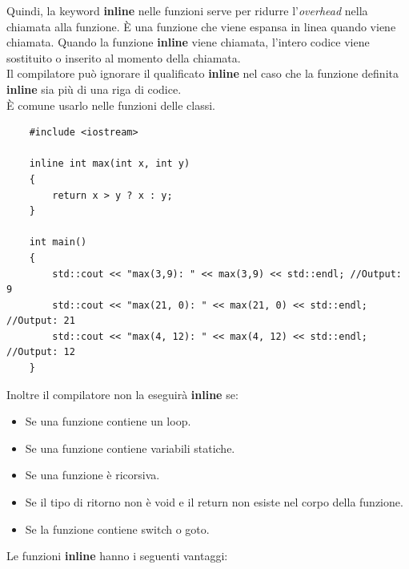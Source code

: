 \textsf{\small Quindi, la keyword \textbf{inline} nelle funzioni serve per ridurre l'\emph{overhead} nella chiamata alla funzione. È una funzione che viene espansa in linea quando viene chiamata. Quando la funzione \textbf{inline} viene chiamata, l'intero codice viene sostituito o inserito al momento della chiamata.} \\

\textsf{\small Il compilatore può ignorare il qualificato \textbf{inline} nel caso che la funzione definita \textbf{inline} sia più di una riga di codice.} \\

\textsf{\small È comune usarlo nelle funzioni delle classi. } \\

\begin{lstlisting}
	#include <iostream>
	
	inline int max(int x, int y)
	{
		return x > y ? x : y;
	}

	int main()
	{
		std::cout << "max(3,9): " << max(3,9) << std::endl; //Output: 9
		std::cout << "max(21, 0): " << max(21, 0) << std::endl; //Output: 21
		std::cout << "max(4, 12): " << max(4, 12) << std::endl; //Output: 12
	}
\end{lstlisting}

\textsf{\small Inoltre il compilatore non la eseguirà \textbf{inline} se: } \\

\begin{itemize}
	\item \textsf{\small Se una funzione contiene un loop.}
	\item \textsf{\small Se una funzione contiene variabili statiche.}
	\item \textsf{\small Se una funzione è ricorsiva.}
	\item \textsf{\small Se il tipo di ritorno non è void e il return non esiste nel corpo della funzione.}
	\item \textsf{\small Se la funzione contiene switch o goto.}
\end{itemize}

\textsf{\small Le funzioni \textbf{inline} hanno i seguenti vantaggi: } \\


